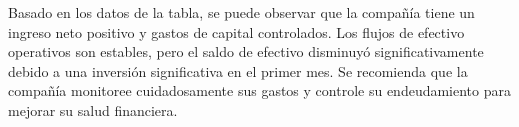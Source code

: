 

Basado en los datos de la tabla, se puede observar que la compañía tiene un ingreso neto positivo y gastos de capital controlados. Los flujos de efectivo operativos son estables, pero el saldo de efectivo disminuyó significativamente debido a una inversión significativa en el primer mes. Se recomienda que la compañía monitoree cuidadosamente sus gastos y controle su endeudamiento para mejorar su salud financiera.